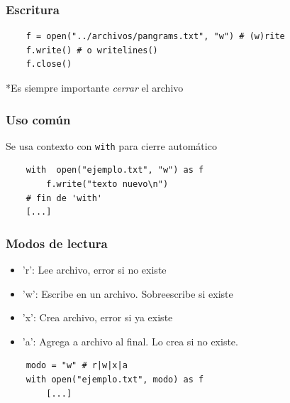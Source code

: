 \documentclass[14pt,aspectratio=169,xcolor=dvipsnames]{beamer}
\begin{document}
\begin{frame}[fragile]\frametitle{Escritura}
    \begin{verbatim}
    f = open("../archivos/pangrams.txt", "w") # (w)rite
    f.write() # o writelines()
    f.close()
    \end{verbatim}

*Es siempre importante \emph{cerrar} el archivo
\end{frame}
\begin{frame}[fragile]\frametitle{Uso común}
    Se usa contexto con {\color{purple}\texttt{with}} para cierre automático
    \begin{verbatim}
    with  open("ejemplo.txt", "w") as f
        f.write("texto nuevo\n") 
    # fin de 'with'
    [...]
    \end{verbatim}
\end{frame}
\begin{frame}[fragile]\frametitle{Modos de lectura}
    \begin{itemize}
        \item 'r': Lee archivo, error si no existe
        \item 'w': Escribe en un archivo. Sobreescribe si existe
        \item 'x': Crea archivo, error si ya existe
        \item 'a': Agrega a archivo al final. Lo crea si no existe.

    \end{itemize}
    
    \vspace{1cm}
    \begin{verbatim}
    modo = "w" # r|w|x|a
    with open("ejemplo.txt", modo) as f
        [...]
    \end{verbatim}
\end{frame}
\begin{frame}


\end{frame}
\end{document}
